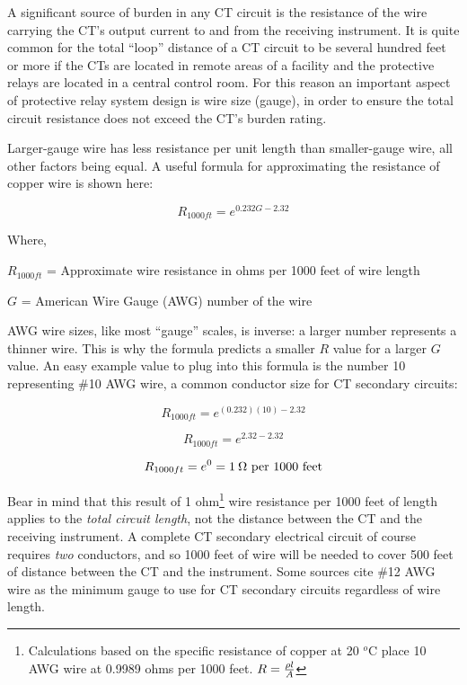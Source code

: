 A significant source of burden in any CT circuit is the resistance of the wire carrying the CT's output current to and from the receiving instrument.  It is quite common for the total ``loop'' distance of a CT circuit to be several hundred feet or more if the CTs are located in remote areas of a facility and the protective relays are located in a central control room.  For this reason an important aspect of protective relay system design is wire size (gauge), in order to ensure the total circuit resistance does not exceed the CT's burden rating.

Larger-gauge wire has less resistance per unit length than smaller-gauge wire, all other factors being equal.  A useful formula for approximating the resistance of copper wire is shown here:

$$R_{1000ft} = e^{0.232 G - 2.32}$$

\noindent
Where,

$R_{1000ft}$ = Approximate wire resistance in ohms per 1000 feet of wire length

$G$ = American Wire Gauge (AWG) number of the wire

\vskip 10pt

AWG wire sizes, like most ``gauge'' scales, is inverse: a larger number represents a thinner wire.  This is why the formula predicts a smaller $R$ value for a larger $G$ value.  An easy example value to plug into this formula is the number 10 representing \#10 AWG wire, a common conductor size for CT secondary circuits:

$$R_{1000ft} = e^{(0.232) (10) - 2.32}$$

$$R_{1000ft} = e^{2.32 - 2.32}$$

$$R_{1000ft} = e^0 = 1 \> \Omega \hbox{ per 1000 feet}$$

Bear in mind that this result of 1 ohm\footnote{Calculations based on the specific resistance of copper at 20 $^{o}$C place 10 AWG wire at 0.9989 ohms per 1000 feet.  $R = {\rho l \over A}$} wire resistance per 1000 feet of length applies to the \textit{total circuit length}, not the distance between the CT and the receiving instrument.  A complete CT secondary electrical circuit of course requires \textit{two} conductors, and so 1000 feet of wire will be needed to cover 500 feet of distance between the CT and the instrument.  Some sources cite \#12 AWG wire as the minimum gauge to use for CT secondary circuits regardless of wire length.










